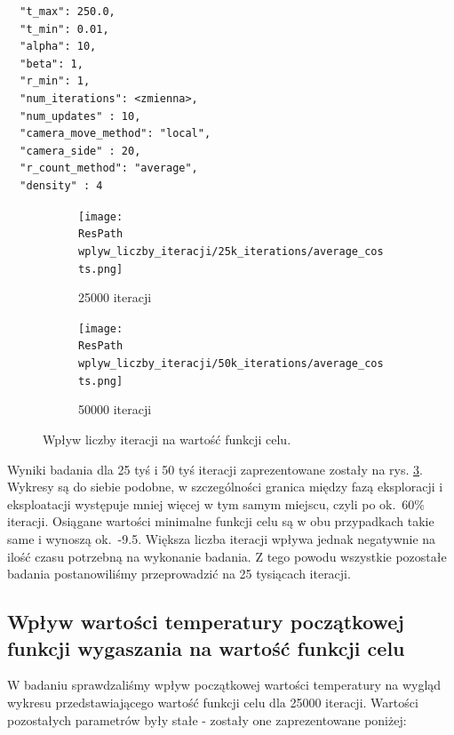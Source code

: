 \documentclass[12pt,a4paper]{article}
\newcommand{\ResPath}{../badania/}
\begin{document}
\begin{lstlisting}
  "t_max": 250.0,
  "t_min": 0.01,
  "alpha": 10,
  "beta": 1,
  "r_min": 1,
  "num_iterations": <zmienna>,
  "num_updates" : 10,
  "camera_move_method": "local",
  "camera_side" : 20,
  "r_count_method": "average",
  "density" : 4
\end{lstlisting}
\begin{figure}[htb]
  \begin{subfigure}[b]{0.5\linewidth}
    \centering
    \texttt{[image: \\ResPath wplyw\_liczby\_iteracji/25k\_iterations/average\_costs.png]}
    \caption{25000 iteracji}
    \label{fig_iterations:a}
    \vspace{2ex}
  \end{subfigure}%
  \begin{subfigure}[b]{0.5\linewidth}
    \texttt{[image: \\ResPath wplyw\_liczby\_iteracji/50k\_iterations/average\_costs.png]}
    \caption{50000 iteracji}
    \label{fig_iterations:b}
    \vspace{2ex}
  \end{subfigure}
  \caption{Wpływ liczby iteracji na wartość funkcji celu.}
  \label{fig_iterations}
\end{figure}
Wyniki badania dla 25 tyś i 50 tyś iteracji zaprezentowane zostały na rys. \ref{fig_iterations}. Wykresy są do siebie podobne, w szczególności granica między
fazą eksploracji i eksploatacji występuje mniej więcej w tym samym miejscu, czyli
po ok.\ 60\% iteracji. Osiągane wartości minimalne funkcji celu są w obu
przypadkach takie same i wynoszą ok.\ -9.5. Większa liczba iteracji wpływa jednak
negatywnie na ilość czasu potrzebną na wykonanie badania. Z tego powodu wszystkie
pozostałe badania postanowiliśmy przeprowadzić na 25 tysiącach iteracji.

\subsection{Wpływ wartości temperatury początkowej funkcji wygaszania na wartość
funkcji celu}
W badaniu sprawdzaliśmy wpływ początkowej wartości temperatury na wygląd wykresu
przedstawiającego wartość funkcji celu dla 25000 iteracji. Wartości pozostałych
parametrów były stałe - zostały one zaprezentowane poniżej:
\end{document}
